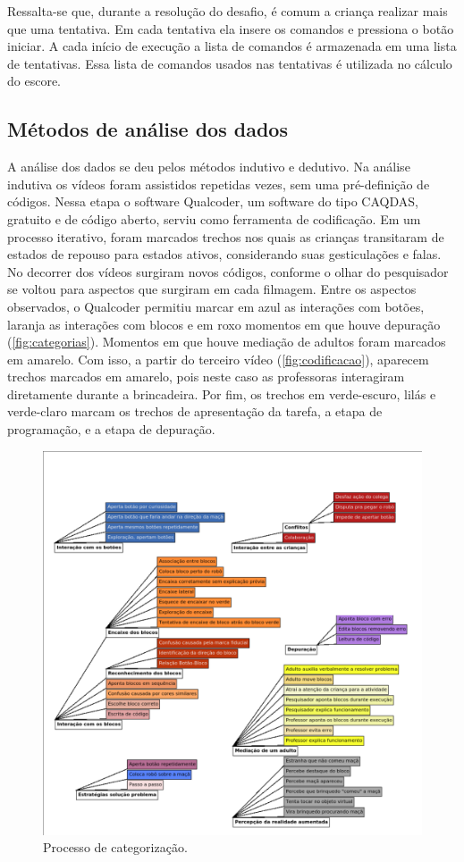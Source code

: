 Ressalta-se que, durante a resolução do desafio, é comum a criança realizar mais que uma tentativa. Em cada tentativa ela insere os comandos e pressiona o botão iniciar. A cada início de execução a lista de comandos é armazenada em uma lista de tentativas. Essa lista de comandos usados nas tentativas é utilizada no cálculo do escore.

\subsection{Métodos de análise dos dados}

A análise dos dados se deu pelos métodos indutivo e dedutivo. Na análise indutiva os vídeos foram assistidos repetidas vezes, sem uma pré-definição de códigos. Nessa etapa o software  Qualcoder, um software do tipo \ac{CAQDAS}, gratuito e de código aberto, serviu como ferramenta de codificação. Em um processo iterativo, foram marcados trechos nos quais as crianças transitaram de estados de repouso para estados ativos, considerando suas gesticulações e falas. No decorrer dos vídeos surgiram novos códigos, conforme o olhar do pesquisador se voltou para aspectos que surgiram em cada filmagem. Entre os aspectos observados, o Qualcoder permitiu marcar em azul as interações com botões, laranja as interações com blocos e em roxo momentos em que houve depuração (\autoref{fig:categorias}). Momentos em que houve mediação de adultos foram marcados em amarelo. Com isso, a partir do terceiro vídeo (\autoref{fig:codificacao}), aparecem trechos marcados em amarelo, pois neste caso as professoras interagiram diretamente durante a brincadeira. Por fim, os trechos em verde-escuro, lilás e verde-claro marcam os trechos de apresentação da tarefa, a etapa de programação, e a etapa de depuração.

\begin{figure}
    \centering
    \includegraphics[width=1\linewidth,fbox]{figs/categorias.png}
    \caption{Processo de categorização.}
    \sourceauthor
    \label{fig:categorias}
\end{figure}


